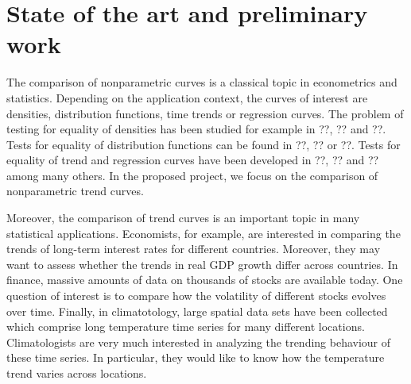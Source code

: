 \documentclass[a4paper,12pt]{article}
\begin{document}



\section{State of the art and preliminary work}


The comparison of nonparametric curves is a classical topic in econometrics and statistics. Depending on the application context, the curves of interest are densities, distribution functions, time trends or regression curves. The problem of testing for equality of densities has been studied for example in ??, ?? and ??. Tests for equality of distribution functions can be found in ??, ?? or ??. Tests for equality of trend and regression curves have been developed in ??, ?? and ?? among many others. In the proposed project, we focus on the comparison of nonparametric trend curves.

Moreover, the comparison of trend curves is an important topic in many statistical applications. Economists, for example, are interested in comparing the trends of long-term interest rates for different countries. Moreover, they may want to assess whether the trends in real GDP growth differ across countries. In finance, massive amounts of data on thousands of stocks are available today. One question of interest is to compare how the volatility of different stocks evolves over time. Finally, in climatotology, large spatial data sets have been collected which comprise long temperature time series for many different locations. Climatologists are very much interested in analyzing the trending behaviour of these time series. In particular, they would like to know how the temperature trend varies across locations. 
\end{document}
